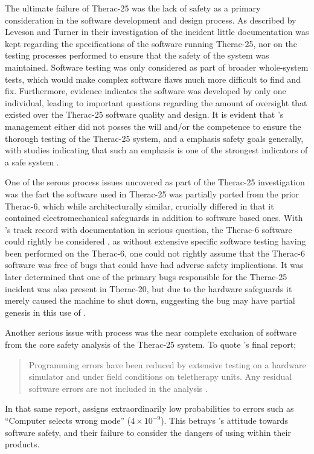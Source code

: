 \documentclass{cshonours}
\newcommand{\ther}{Therac-25\xspace}
\begin{document}
The ultimate failure of \ther was the lack of safety as a primary consideration in the software development and design process. As described by Leveson and Turner \cite{leveson1993investigation} in their investigation of the incident little documentation was kept regarding the specifications of the software running \ther, nor on the testing processes performed to ensure that the safety of the system was maintained. Software testing was only considered as part of broader whole-system tests, which would make complex software flaws much more difficult to find and fix. Furthermore, evidence indicates the software was developed by only one individual, leading to important questions regarding the amount of oversight that existed over the \ther software quality and design. It is evident that \aecl's management either did not posses the will and/or the competence to ensure the thorough testing of the \ther system, and a emphasis safety goals generally, with studies indicating that such an emphasis is one of the strongest indicators of a safe system \cite[p.~415]{saferworld}.

One of the serous process issues uncovered as part of the \ther investigation was the fact the software used in \ther was partially ported from the prior Therac-6, which while architecturally similar, crucially differed in that it contained electromechanical safeguards in addition to software based ones. With \aecl's track record with documentation in serious question, the Therac-6 software could rightly be considered \soup, as without extensive specific software testing having been performed on the Therac-6, one could not rightly assume that the Therac-6 software was free of bugs that could have had adverse safety implications. It was later determined that one of the primary bugs responsible for the \ther incident was also present in Therac-20, but due to the hardware safeguards it merely caused the machine to shut down, suggesting the bug may have partial genesis in this use of \soup.

Another serious issue with process was the near complete exclusion of software from the core safety analysis of the \ther system. To quote \aecl's final report; 
\begin{quote}
Programming errors have been reduced by extensive testing on a hardware simulator and under field conditions on teletherapy units. Any residual software errors are not included in the analysis \cite[p.~4]{leveson1993investigation}.
\end{quote}
In that same report, \aecl assigns extraordinarily low probabilities to errors such as ``Computer selects wrong mode'' ($4 \times 10^{-9}$). This betrays \aecl's attitude towards software safety, and their failure to consider the dangers of using \soup within their products. 
\end{document}
